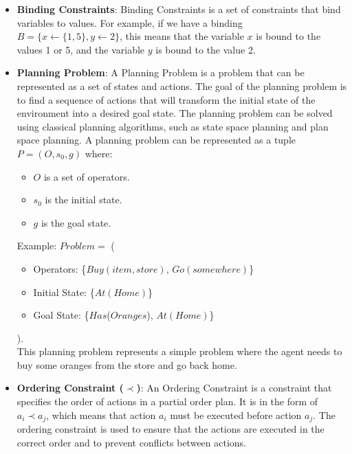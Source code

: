 \begin{itemize}
    \item \label{def:binding_constraint}
          \textbf{Binding Constraints}: Binding Constraints is a set of constraints that bind variables to values.
          For example, if we have a binding $B = \{x \leftarrow \{1,5\}, y \leftarrow 2\}$, this means that the variable $x$ is bound to the values 1 or 5,
          and the variable $y$ is bound to the value 2.

    \item \label{def:planning_problem}
          \textbf{Planning Problem}: A Planning Problem is a problem that can be represented as a set of states and actions. The goal of the planning problem is to find a sequence of actions that will transform the initial state of the environment into a desired goal state. The planning problem can be solved using classical planning algorithms, such as state space planning and plan space planning. A planning problem can be represented as a tuple $P = (O, s_0, g)$ \cite{10.5555/975615} where:
          \begin{itemize}
              \item $O$ is a set of operators.
              \item $s_0$ is the initial state.
              \item $g$ is the goal state.
          \end{itemize}
          Example: $Problem =$ (
          \begin{itemize}
              \item Operators: \{$Buy(item,store)$, $Go(somewhere)$\}
              \item Initial State: \{$At(Home)$\}
              \item Goal State: \{$Has$($Oranges$), $At(Home)$\}
          \end{itemize}
          ).\\
          This planning problem represents a simple problem where the agent needs to buy some oranges from the store and go back home.

    \item  \label{def:ordering_constraint}
          \textbf{Ordering Constraint ($\prec$)}: An Ordering Constraint is a constraint that specifies the order of actions in a partial order plan. It is in the form of $a_i \prec a_j$, which means that action $a_i$ must be executed before action $a_j$. The ordering constraint is used to ensure that the actions are executed in the correct order and to prevent conflicts between actions.


\end{itemize}

